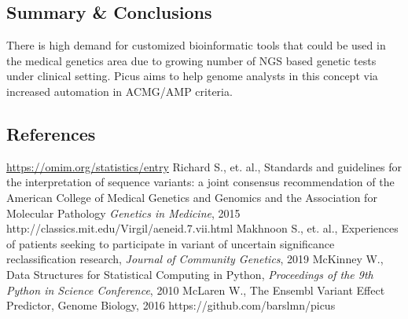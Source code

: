 \documentclass[final]{beamer}
\begin{document}
\begin{frame}[t]
\begin{multicols}{3}
\section{Summary \& Conclusions}

\begin{block}{}
There is high demand for customized bioinformatic tools that could be used in
the medical genetics area due to growing number of NGS based genetic tests under clinical setting.
Picus aims to help genome analysts in this concept via increased automation in ACMG/AMP criteria.
\end{block}



\subsection{References}

\begin{thebibliography}{99}

\footnotesize
\renewcommand{\baselinestretch}{.2}
 \url{https://omim.org/statistics/entry}
 Richard S., et. al., Standards and guidelines for the interpretation of sequence variants: a joint consensus recommendation of the American College of Medical Genetics and Genomics and the Association for Molecular Pathology \textit{Genetics in Medicine}, 2015
 http://classics.mit.edu/Virgil/aeneid.7.vii.html
 Makhnoon S., et. al., Experiences of patients seeking to participate in variant of uncertain significance reclassification research, \textit{Journal of Community Genetics}, 2019
 McKinney W., Data Structures for Statistical Computing in Python, \textit{Proceedings of the 9th Python in Science Conference}, 2010
 McLaren W., The Ensembl Variant Effect Predictor, Genome Biology, 2016
 https://github.com/barslmn/picus
\normalsize

\end{thebibliography}

\footnotesize


\end{multicols}
\end{frame}
\end{document}
